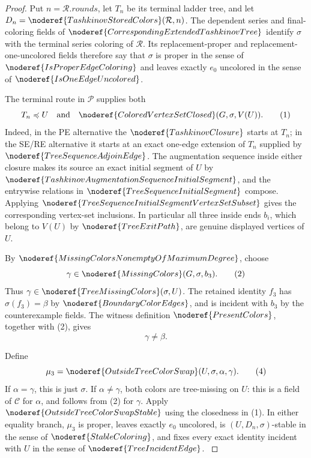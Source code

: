 \begin{proof}
Put \(n=\mathcal R.\mathit{rounds}\), let \(T_n\) be its terminal
ladder tree, and let
\(D_n=\noderef{TashkinovStoredColors}(\mathcal R,n)\).  The dependent
series and final-coloring fields of
\(\noderef{CorrespondingExtendedTashkinovTree}\) identify \(\sigma\)
with the terminal series coloring of \(\mathcal R\).  Its
replacement-proper and replacement-one-uncolored fields therefore say
that \(\sigma\) is proper in the sense of
\(\noderef{IsProperEdgeColoring}\) and leaves exactly \(e_0\)
uncolored in the sense of \(\noderef{IsOneEdgeUncolored}\).

The terminal route in \(\mathcal P\) supplies both
\[
             T_n\preccurlyeq U
   \quad\hbox{and}\quad
             \noderef{ColoredVertexSetClosed}(G,\sigma,V(U)). \tag{1}
\]
Indeed, in the PE alternative the
\(\noderef{TashkinovClosure}\) starts at \(T_n\); in the SE/RE
alternative it starts at an exact one-edge extension of \(T_n\) supplied
by \(\noderef{TreeSequenceAdjoinEdge}\).  The augmentation sequence
inside either closure makes its source an exact initial segment of \(U\)
by \(\noderef{TashkinovAugmentationSequenceInitialSegment}\), and the
entrywise relations in \(\noderef{TreeSequenceInitialSegment}\) compose.
Applying \(\noderef{TreeSequenceInitialSegmentVertexSetSubset}\) gives
the corresponding vertex-set inclusions.  In particular all three
inside ends \(b_i\), which belong to \(V(U)\) by
\(\noderef{TreeExitPath}\), are genuine displayed vertices of \(U\).

By \(\noderef{MissingColorsNonemptyOfMaximumDegree}\), choose
\[
                    \gamma\in
                    \noderef{MissingColors}(G,\sigma,b_3).   \tag{2}
\]
Thus \(\gamma\in\noderef{TreeMissingColors}(\sigma,U)\).
The retained identity \(f_3\) has \(\sigma(f_3)=\beta\) by
\(\noderef{BoundaryColorEdges}\), and is incident with \(b_3\) by the
counterexample fields.  The witness definition
\(\noderef{PresentColors}\), together with (2), gives
\[
                              \gamma\ne\beta.                 \tag{3}
\]

Define
\[
 \mu_3=\noderef{OutsideTreeColorSwap}(U,\sigma,\alpha,\gamma).
                                                                    \tag{4}
\]
If \(\alpha=\gamma\), this is just \(\sigma\).  If
\(\alpha\ne\gamma\), both colors are tree-missing on \(U\): this is a
field of \(\mathcal C\) for \(\alpha\), and follows from (2) for
\(\gamma\).  Apply \(\noderef{OutsideTreeColorSwapStable}\) using the
closedness in (1).  In either equality branch, \(\mu_3\) is proper,
leaves exactly \(e_0\) uncolored, is
\((U,D_n,\sigma)\)-stable in the sense of
\(\noderef{StableColoring}\), and fixes every exact identity incident
with \(U\) in the sense of \(\noderef{TreeIncidentEdge}\).             \(\tag{5}\)


\end{proof}
